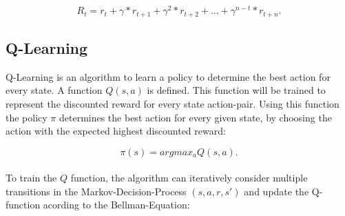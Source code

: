\begin{equation*}
R_t = r_t + \gamma * r_{t+1}  +  \gamma^2 * r_{t+2}   +   ...   +    \gamma^{n-t} * r_{t+n}. 
\end{equation*}


\subsection{Q-Learning}

Q-Learning is an algorithm to learn a policy to determine the best action for every state. A function $Q(s, a)$ is defined. This function will be trained to represent the discounted reward for every state action-pair. Using this function the policy $\pi$ determines the best action for every given state, by choosing the action with the expected highest discounted reward:

\begin{equation*}
\pi(s) = argmax_a Q(s, a).
\end{equation*}
\\
To train the $Q$ function, the algorithm can iteratively consider multiple transitions in the Markov-Decision-Process $(s, a, r, s')$ and update the Q-function acording to the Bellman-Equation:

